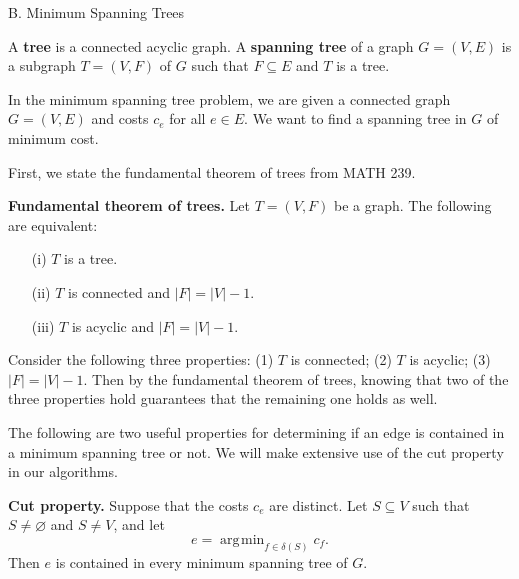 \documentclass{article}
\DeclareMathOperator*{\argmin}{\arg\!\min}
\begin{document}
\newpage
\begin{center}
    {\sc B. Minimum Spanning Trees}
\end{center}

A {\bf tree} is a connected acyclic graph. A {\bf spanning tree} of a graph 
$G = (V, E)$ is a subgraph $T = (V, F)$ of $G$ such that $F \subseteq E$ and 
$T$ is a tree. 

In the minimum spanning tree problem, we are given a connected graph $G = (V, E)$
and costs $c_e$ for all $e \in E$. We want to find a spanning tree in $G$ 
of minimum cost.  

First, we state the fundamental theorem of trees from MATH 239. 

{\color{violet}
{\bf Fundamental theorem of trees.} Let $T = (V, F)$ be a graph. 
The following are equivalent: 
\begin{enumerate}
    \item [(i)] $T$ is a tree.
    \item [(ii)] $T$ is connected and $|F| = |V| - 1$. 
    \item [(iii)] $T$ is acyclic and $|F| = |V| - 1$. 
\end{enumerate}}

Consider the following three properties: (1) $T$ is 
connected; (2) $T$ is acyclic; (3) $|F| = |V| - 1$. Then 
by the fundamental theorem of trees, 
knowing that two of the three properties hold guarantees that the remaining one 
holds as well.

The following are two useful properties for determining if an edge 
is contained in a minimum spanning tree or not. We will make 
extensive use of the cut property in our algorithms.

{\color{violet}
{\bf Cut property.} Suppose that the costs $c_e$ are distinct. 
Let $S \subseteq V$ such that $S \neq \varnothing$ and $S \neq V$, and let 
\[ e = \argmin_{f \in \delta(S)} c_f. \]
Then $e$ is contained in every minimum spanning tree of $G$.}
\end{document}
